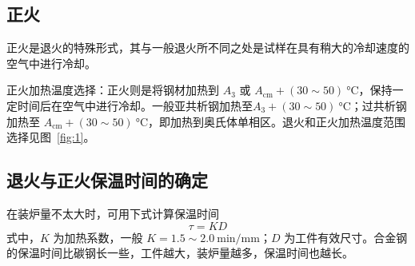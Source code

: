 \documentclass[a4paper,utf8]{article}
\newcommand{\fgref}[1]{图~\ref{#1}\xspace}
\begin{document}
    \subsection{正火}
        正火是退火的特殊形式，其与一般退火所不同之处是试样在具有稍大的冷却速度的空气中进行冷却。\par
        正火加热温度选择：正火则是将钢材加热到 $A_3$ 或 $A_{\textrm{cm}} + (30 \sim 50)~\unit{\degreeCelsius}$，保持一定时间后在空气中进行冷却。一般亚共析钢加热至$A_3 + (30 \sim 50)~\unit{\degreeCelsius}$；过共析钢加热至 $A_{\textrm{cm}} + (30 \sim 50)~\unit{\degreeCelsius}$，即加热到奥氏体单相区。退火和正火加热温度范围选择见\fgref{fig:1}。
        \begin{figure}[!ht]
        \begin{floatrow}\centering
        \end{floatrow}
        \end{figure}
    \subsection{退火与正火保温时间的确定}
        在装炉量不太大时，可用下式计算保温时间
        \begin{equation}
            \tau = K D \label{equ:1}
        \end{equation}
        式中，$K$ 为加热系数，一般 $K=1.5 \sim \SI{2.0}{\minute/\milli\metre}$；$D$ 为工件有效尺寸。合金钢的保温时间比碳钢长一些，工件越大，装炉量越多，保温时间也越长。
\end{document}
